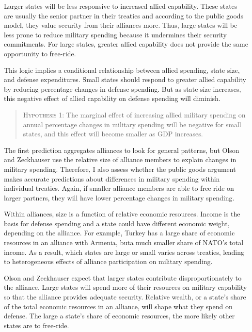 \documentclass[12pt]{article}
\begin{document}
 
Larger states will be less responsive to increased allied capability. 
These states are usually the senior partner in their treaties and according to the public goods model, they value security from their alliances more. 
Thus, large states will be less prone to reduce military spending because it undermines their security commitments. 
For large states, greater allied capability does not provide the same opportunity to free-ride.


This logic implies a conditional relationship between allied spending, state size, and defense expenditures. 
Small states should respond to greater allied capability by reducing percentage changes in defense spending. 
But as state size increases, this negative effect of allied capability on defense spending will diminish. 


\begin{quote}
\textsc{Hypothesis 1}: The marginal effect of increasing allied military spending on annual percentage changes in military spending will be negative for small states, and this effect will become smaller as GDP increases. 
\end{quote}


The first prediction aggregates alliances to look for general patterns, but Olson and Zeckhauser use the relative size of alliance members to explain changes in military spending. 
Therefore, I also assess whether the public goods argument makes accurate predictions about differences in military spending within individual treaties. 
Again, if smaller alliance members are able to free ride on larger partners, they will have lower percentage changes in military spending.  

 
Within alliances, size is a function of relative economic resources.
Income is the basis for defense spending and a state could have different economic weight, depending on the alliance. 
For example, Turkey has a large share of economic resources in an alliance with Armenia, buta much smaller share of NATO's total income. 
As a result, which states are large or small varies across treaties, leading to heterogeneous effects of alliance participation on military spending. 


Olson and Zeckhauser expect that larger states contribute disproportionately to the alliance. 
Large states will spend more of their resources on military capability so that the alliance provides adequate security. 
Relative wealth, or a state's share of the total economic resources in an alliance, will shape what they spend on defense. 
The large a state's share of economic resources, the more likely other states are to free-ride. 
\end{document}
